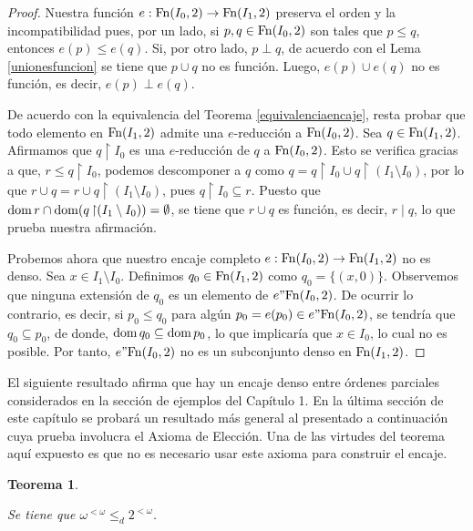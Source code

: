 \documentclass[11pt]{unam_tesis1}
\theoremstyle{MyThmStyle}
\theoremstyle{definition}
\theoremstyle{plain}
\newtheorem{theorem}[definition]{Teorema}
\theoremstyle{remark}
\def\dom{\mathop{\rm dom}\nolimits}
\def\rest{\mathop{\upharpoonright}\nolimits}
\let\leq\leqslant
\begin{document}
\begin{proof}
Nuestra funci\'on $e:{\rm Fn}(I_0,2) \to {\rm Fn}(I_1,2)$ preserva el orden y la incompatibilidad pues, por un lado, si $p,q\in {\rm Fn}(I_0,2)$ son tales que $p\leq q$, entonces $e(p)\leq e(q)$. Si, por otro lado, $p\perp q$, de acuerdo con el Lema \ref{unionesfuncion} se tiene que $p\cup q$ no es funci\'on. Luego, $e(p)\cup e(q)$ no es funci\'on, es decir, $e(p)\perp e(q)$.

De acuerdo con la equivalencia del Teorema \ref{equivalenciaencaje}, resta probar que todo elemento en ${\rm Fn}(I_1,2)$ admite una $e$-reducci\'on a ${\rm Fn}(I_0,2)$. Sea $q\in {\rm Fn}(I_1,2)$. Afirmamos que $q\rest I_0$ es una $e$-reducci\'on de $q$ a ${\rm Fn}(I_0,2)$. Esto se verifica gracias a que, $r\leq q\rest I_0$, podemos descomponer a $q$ como $q=q\rest I_0\cup q\rest (I_1\setminus I_0)$, por lo que $r\cup q=r\cup q\rest (I_1\setminus I_0)$, pues $q\rest I_0\subseteq r$. Puesto que $\dom r\cap \dom (q\rest (I_1\setminus I_0))=\emptyset$, se tiene que $r\cup q$ es funci\'on, es decir, $r\mid q$, lo que prueba nuestra afirmaci\'on.

Probemos ahora que nuestro encaje completo $e:{\rm Fn}(I_0,2) \to {\rm Fn}(I_1,2)$ no es denso. Sea $x\in I_1\setminus I_0$. Definimos $q_0\in {\rm Fn}(I_1,2)$ como $q_0=\{(x,0)\}$. Observemos que ninguna extensi\'on de $q_0$ es un elemento de $e"{\rm Fn}(I_0,2)$. De ocurrir lo contrario, es decir, si $p_0\leq q_0$ para alg\'un $p_0=e(p_0)\in e"{\rm Fn}(I_0,2)$, se tendr\'ia que $q_0\subseteq p_0$, de donde, $\dom q_0\subseteq \dom p_0$, lo que implicar\'ia que $x\in  I_0$, lo cual no es posible. Por tanto, $e"{\rm Fn}(I_0,2)$ no es un subconjunto denso en ${\rm Fn}(I_1,2)$.
\end{proof}

El siguiente resultado afirma que hay un encaje denso entre \'ordenes parciales con\-si\-de\-ra\-dos en la secci\'on de ejemplos del Cap\'itulo 1. En la \'ultima secci\'on de este cap\'itulo se probar\'a un resultado m\'as general al presentado a continuaci\'on cuya prueba involucra el Axioma de Elecci\'on. Una de las virtudes del teorema aqu\'i expuesto es que no es necesario usar este axioma para construir el encaje.

\begin{theorem}\label{ejemplodenso}

Se tiene que $\omega^{<\omega}\leq_d 2^{<\omega}$.

\end{theorem}
\end{document}
